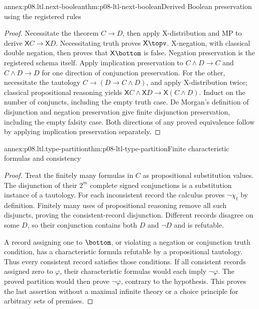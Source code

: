 \begin{annexitem}{annex:p08.ltl.next-boolean}{thm:p08-ltl-next-boolean}{Derived Boolean preservation using the registered rules}
\begin{proof}
Necessitate the theorem \(C\to D\), then apply X-distribution
and MP to derive \(\mathsf XC\to\mathsf XD\).
Necessitating truth proves \(\mathsf X\topv\). X-negation,
with classical double negation, then proves that \(\mathsf X\bottom\)
is false. Negation preservation is the registered schema itself.
Apply implication preservation to \(C\land D\to C\) and
\(C\land D\to D\) for one direction of conjunction preservation.
For the other, necessitate the tautology
\(C\to(D\to C\land D)\), and apply X-distribution twice;
classical propositional reasoning yields
\(\mathsf XC\land\mathsf XD\to\mathsf X(C\land D)\).
Induct on the number of conjuncts, including the empty truth case.
De Morgan's definition of disjunction and negation preservation
give finite disjunction preservation, including the empty falsity
case. Both directions of any proved equivalence follow by applying
implication preservation separately.
\end{proof}
\end{annexitem}

\begin{annexitem}{annex:p08.ltl.type-partition}{thm:p08-ltl-type-partition}{Finite characteristic formulas and consistency}
\begin{proof}
Treat the finitely many formulas in \(C\) as propositional
substitution values. The disjunction of their \(2^m\) complete
signed conjunctions is a substitution instance of a tautology.
For each inconsistent record the calculus proves \(\neg\chi_t\)
by definition. Finitely many uses of propositional reasoning remove
all such disjuncts, proving the consistent-record disjunction.
Different records disagree on some \(D\), so their conjunction
contains both \(D\) and \(\neg D\) and is refutable.

A record assigning one to \(\bottom\), or violating a negation
or conjunction truth condition, has a characteristic formula
refutable by a propositional tautology. Thus every consistent record
satisfies those conditions. If all consistent records assigned
zero to \(\varphi\), their characteristic formulas would each
imply \(\neg\varphi\). The proved partition would then prove
\(\neg\varphi\), contrary to the hypothesis. This proves the
last assertion without a maximal infinite theory or a choice
principle for arbitrary sets of premises.
\end{proof}
\end{annexitem}

